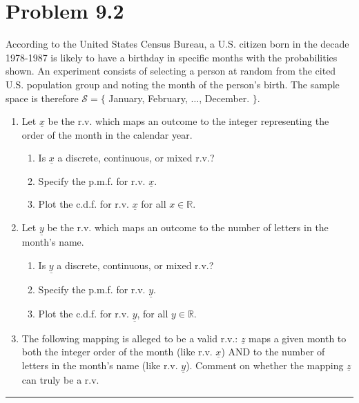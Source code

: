 \documentclass{article}
\newcommand{\horline}
           {\begin{center}
              \noindent\rule{8cm}{0.4pt}
            \end{center}}
\begin{document}
\section*{Problem 9.2}
According to the United States Census Bureau, a U.S. citizen born in the
decade 1978-1987 is likely to have a birthday in specific months with the 
probabilities shown.  An experiment consists of selecting a person at random
from the cited U.S. population group and noting the month of the person's
birth. The sample space is therefore $\mathcal{S} = \{$ January, February, 
$\dots$, December. $\}$.
\begin{enumerate}[label=(\alph*)]
  \item{Let $\underline{x}$ be the r.v. which maps an outcome to the 
integer representing the order of the month in the calendar year.
    \begin{enumerate}[label=(\roman*)]
      \item{Is $\underline{x}$ a discrete, continuous, or mixed r.v.?}
      \item{Specify the p.m.f. for r.v. $\underline{x}$.}
      \item{Plot the c.d.f. for r.v. $\underline{x}$ for all 
            $x \in \mathbb{R}$.}
    \end{enumerate}
      }
  \item{Let $\underline{y}$ be the r.v. which maps an outcome to the number
of letters in the month's name.
    \begin{enumerate}[label=(\roman*)]
      \item{Is $\underline{y}$ a discrete, continuous, or mixed r.v.?}
      \item{Specify the p.m.f. for r.v. $\underline{y}$.}
      \item{Plot the c.d.f. for r.v. $\underline{y}$, for all 
            $y \in \mathbb{R}$.}
    \end{enumerate}
       }
  \item{The following mapping is alleged to be a valid r.v.: $\underline{z}$
        maps a given month to both the integer order of the month (like 
        r.v. $\underline{x}$) AND to the number of letters in the month's 
        name (like r.v. $\underline{y}$). Comment on whether the mapping
        $\underline{z}$ can truly be a r.v.
       }
\end{enumerate}
\horline
\end{document}
